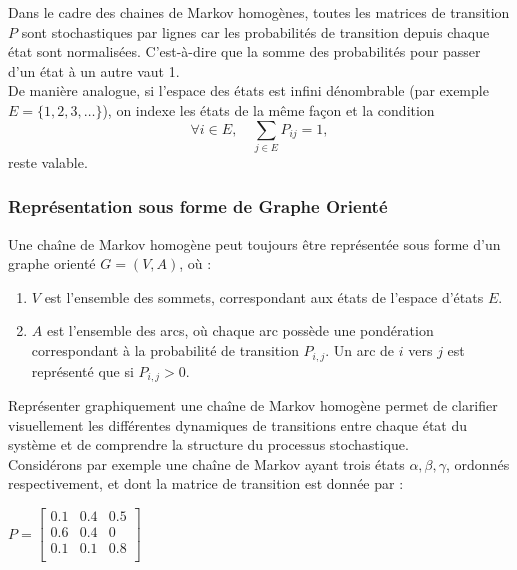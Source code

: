 \documentclass{article}
\begin{document}
Dans le cadre des chaines de Markov homogènes, toutes les matrices de transition $P$ sont stochastiques par lignes car les probabilités de transition depuis chaque état sont normalisées. C'est-à-dire que la somme des probabilités pour passer d'un état à un autre vaut 1. \\

De manière analogue, si l'espace des états est infini dénombrable (par exemple $E = \{1, 2, 3, \dots\}$), on indexe les états de la même façon et la condition
\[
\forall i \in E, \quad \sum_{j \in E} P_{ij} = 1,
\]
reste valable. \\

\subsubsection{Représentation sous forme de Graphe Orienté}
\label{subsubsec: Représentation sous forme de graphe orienté}

\begin{tcolorbox}[colback=white,colframe=red!80!black,title=Graphe Orienté d'une Chaîne de Markov]
Une chaîne de Markov homogène peut toujours être représentée sous forme d'un graphe orienté $ G = (V, A) $, où :
\begin{enumerate}[leftmargin=5em, label=(\arabic*)]
    \item $ V $ est l'ensemble des sommets, correspondant aux états de l'espace d'états $ E $.
    \item $ A $ est l'ensemble des arcs, où chaque arc possède une pondération correspondant à la probabilité de transition $P_{i,j}$. Un arc de $i$ vers $j$ est représenté que si $P_{i,j} > 0$.
\end{enumerate}
\end{tcolorbox}

Représenter graphiquement une chaîne de Markov homogène permet de clarifier visuellement les différentes dynamiques de transitions entre chaque état du système et de comprendre la structure du processus stochastique. \\

Considérons par exemple une chaîne de Markov ayant trois états $\alpha, \beta, \gamma$, ordonnés respectivement, et dont la matrice de transition est donnée par :

\begin{center}
$
P = \begin{bmatrix}
0.1 & 0.4 & 0.5 \\
0.6 & 0.4 & 0 \\
0.1 & 0.1 & 0.8 \\
\end{bmatrix}
$
\end{center}
\end{document}
